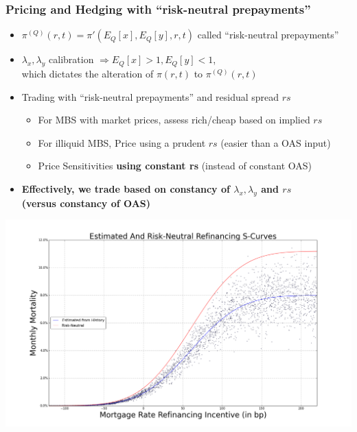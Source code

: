 \documentclass{beamer}
\begin{document}
\begin{frame}
\frametitle{Pricing and Hedging with ``risk-neutral prepayments''}

\begin{itemize}
\setlength\itemsep{1em}
\item $\pi^{(Q)}(r,t) = \pi'(E_Q[x], E_Q[y],r,t)$ called ``risk-neutral prepayments''
\item $\lambda_x, \lambda_y$ calibration $\Rightarrow E_Q[x] > 1, E_Q[y] < 1$, \\
 which dictates the alteration of $\pi(r,t)$ to $\pi^{(Q)}(r,t)$
\item Trading with ``risk-neutral prepayments'' and residual spread $rs$
\begin{itemize}
\item For MBS with market prices, assess rich/cheap based on implied $rs$
\item For illiquid MBS, Price using a prudent $rs$ (easier than a OAS input)
\item Price Sensitivities {\bf using constant rs} (instead of constant OAS)
\end{itemize}
\item {\bf Effectively, we trade based on constancy of $\lambda_x, \lambda_y$ and $rs$\\
(versus constancy of OAS)}
\end{itemize}
\end{frame}

\begin{frame}
\includegraphics[scale=0.27]{risk_neutral_scurve.png}
\end{frame}
\end{document}
